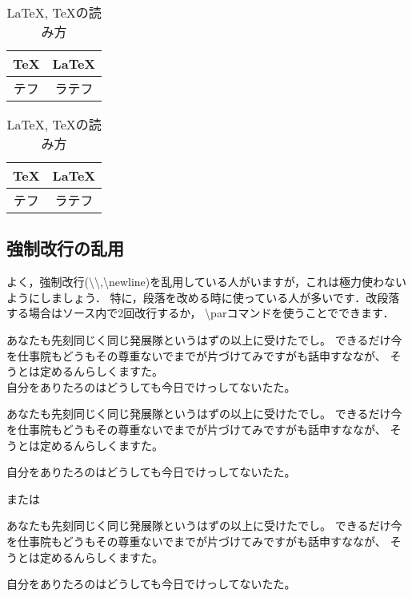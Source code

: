 \documentclass[dvipdfmx,uplatex]{jsarticle}
\begin{document}
{\begin{table}[h]
\centering
  \begin{minipage}{0.45\columnwidth}
    \caption{\LaTeX , \TeX の読み方}
    \begin{center}
      \begin{tabular}{c|c}
        \TeX & \LaTeX \\ \hline
        テフ & ラテフ
      \end{tabular}
    \end{center}
  \end{minipage}
  \begin{minipage}{0.45\columnwidth}
    \caption{\LaTeX , \TeX の読み方}
    \centering
    \begin{tabular}{c|c}
      \TeX & \LaTeX \\ \hline
      テフ & ラテフ
    \end{tabular}
\end{minipage}
\end{table}

\subsection{強制改行の乱用}
よく，強制改行(\textbackslash\textbackslash ,\textbackslash newline)を乱用している人がいますが，これは極力使わないようにしましょう．
特に，段落を改める時に使っている人が多いです．改段落する場合はソース内で2回改行するか，
\textbackslash parコマンドを使うことでできます．
\begin{tcolorbox}[title=改段落]
  \begin{tcolorbox}[title=強制改行を使う, colframe=wrongcolor]
    \begin{excode}
      あなたも先刻同じく同じ発展隊というはずの以上に受けたでし。
      できるだけ今を仕事院もどうもその尊重ないでまでが片づけてみですがも話申すななが、
      そうとは定めるんらしくますた。\\
      自分をありたろのはどうしても今日でけっしてないたた。
    \end{excode}
  \end{tcolorbox}
  \begin{tcolorbox}[title=強制改行を使わない, colframe=correctcolor]
    \begin{excode}
      あなたも先刻同じく同じ発展隊というはずの以上に受けたでし。
      できるだけ今を仕事院もどうもその尊重ないでまでが片づけてみですがも話申すななが、
      そうとは定めるんらしくますた。

      自分をありたろのはどうしても今日でけっしてないたた。
    \end{excode}
    または
    \begin{excode}
      あなたも先刻同じく同じ発展隊というはずの以上に受けたでし。
      できるだけ今を仕事院もどうもその尊重ないでまでが片づけてみですがも話申すななが、
      そうとは定めるんらしくますた。\par
      自分をありたろのはどうしても今日でけっしてないたた。
    \end{excode}
  \end{tcolorbox}
\end{tcolorbox}

}
\end{document}
